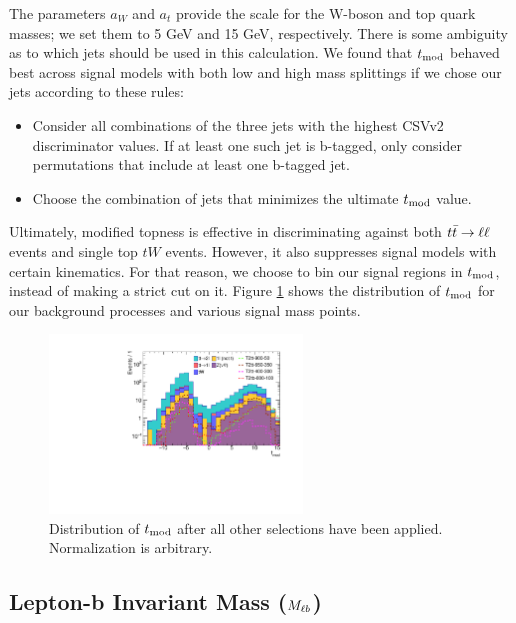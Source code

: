 The parameters $a_W$ and $a_t$ provide the scale for the W-boson
and top quark masses; we set them to 5 GeV and 15 GeV, respectively.
There is some ambiguity as to which jets should be used in this
calculation. We found that $t_\text{mod}$ behaved best across signal
models with both low and high mass splittings if we chose our jets
according to these rules:
\begin{itemize}
\item Consider all combinations of the three jets with the highest
  CSVv2 discriminator values. If at least one such jet is b-tagged,
  only consider permutations that include at least one b-tagged jet.
\item Choose the combination of jets that minimizes the ultimate
  $t_\text{mod}$ value.
\end{itemize}
Ultimately, modified topness is effective in discriminating against
both $t\bar{t} \rightarrow \ell\ell$ events and single top $tW$ events. However, it also
suppresses signal models with certain kinematics. For that reason, we
choose to bin our signal regions in $t_\text{mod}$, instead of making
a strict cut on it. Figure \ref{fig:stop:tmod} shows the distribution
of $t_\text{mod}$ for our background processes and various signal mass
points.

\begin{figure}
\centering
\includegraphics[width=0.6\textwidth]{figures/nminusone_tmod.pdf}
\caption{Distribution of $t_\text{mod}$ after all other selections
  have been applied. Normalization is arbitrary.}
\label{fig:stop:tmod}
\end{figure}

\subsection{Lepton-b Invariant Mass (\texorpdfstring{$M_{\ell b}$}{mlb})}
\label{ssec:stop:mlb}

